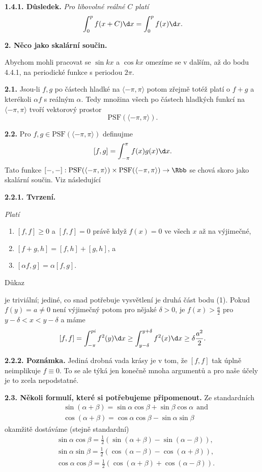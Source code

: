 \documentclass[12pt]{article}
\begin{document}
\smallskip

{\bf 1.4.1. Důsledek.} {\em Pro libovolné reálné $C$ platí
$$
\int_{0}^{p}f(x+C)\d x=\int_{0}^{p}f(x)\d x.
$$}

 \vskip10mm
 
 {\large\bf 2. Něco jako skalární součin.}
 
 \bigskip

Abychom mohli pracovat se $\sin kx$ a $\cos kx$ omezíme se v dalším, až do bodu 4.4.1, na periodické funkce s periodou $2\pi$.

\bigskip

{\bf 2.1.} Jsou-li $f,g$ po částech hladké na $\langle-\pi,\pi\rangle$ potom zřejmě totéž platí o $f+g$ a kterékoli $\alpha f$ s reálným $\alpha$.
Tedy množina všech po částech hladkých funkcí na $\langle-\pi,\pi\rangle$
tvoří vektorový prostor
$$
\text{PSF}(\langle-\pi,\pi\rangle).
$$

\bigskip

{\bf 2.2.} Pro $f,g\in\text{PSF}(\langle-\pi,\pi\rangle)$ definujme
$$
[f,g]=\int_{-\pi}^{\pi}f(x)g(x)\d x.
$$
Tato funkce $[-,-]:\text{PSF}(\langle-\pi,\pi\rangle)\times\text{PSF}(\langle-\pi,\pi\rangle)\to\Rbb$
se chová skoro jako skalární součin. Viz následující

\medskip

{\bf 2.2.1. Tvrzení.} {\em Platí
\begin{enumerate}
\item $[f,f]\geq 0$ a $[f,f]=0$ právě když $f(x)=0$ ve všech $x$ až na výjimečné,
\item $[f+g,h]=[f,h]+[g,h]$, a
\item $[\alpha f,g]=\alpha[f,g]$.
\end{enumerate}

Důkaz} je triviální; jediné, co snad potřebuje vysvětlení je druhá část bodu (1).  Pokud $f(y)=a\neq 0$ není výjimečný potom pro nějaké $\delta>0$, je $f(x)>\frac{a}{2}$   pro $y-\delta < x <y-\delta$ a máme
$$
[f,f]=\int_{-\pi}^{pi}f^2(y)\d x\geq\int_{y-\delta}^{y+\delta}f^2(x)\d x\geq\delta\frac{a^2}{2}.
$$
\sq
 

 \medskip

{\bf 2.2.2. Poznámka.} Jediná drobná vada krásy je v tom, že
 $[f,f]$ tak úplně neimplikuje $f\equiv 0$. To se ale týká jen konečně mnoha argumentů a pro naše účely je to zcela nepodstatné.

\bigskip

{\bf 2.3. Několi formulí, které si potřebujeme připomenout.} Ze standardních
$$
\begin{aligned}
&\sin(\alpha+\beta)=\sin\alpha\cos\beta+\sin\beta\cos\alpha\ \ \text{and}\\
&\cos(\alpha+\beta)=\cos\alpha\cos\beta-\sin\alpha\sin\beta
\end{aligned}
$$ 
okamžitě dostáváme (stejně standardní)
$$
\begin{aligned}
&\sin\alpha\cos\beta=\frac12(\sin(\alpha+\beta)-\sin(\alpha-\beta)),\\
&\sin\alpha\sin\beta=\frac12(\cos(\alpha-\beta)-\cos(\alpha+\beta)),\\
&\cos\alpha\cos\beta=\frac12(\cos(\alpha+\beta)+\cos(\alpha-\beta)).
\end{aligned}
$$
\bigskip
\end{document}
